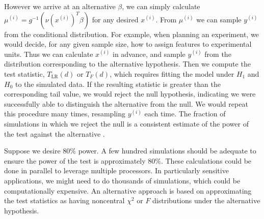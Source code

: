 \documentclass[12pt]{article}
\begin{document}
However we arrive at an alternative $\beta$, we can simply calculate $\mu^{(i)} = g^{-1}(\nu(x^{(i)})^T \beta)$ for any desired $x^{(i)}$. From $\mu^{(i)}$ we can sample $y^{(i)}$ from the conditional distribution. For example, when planning an experiment, we would decide, for any given sample size, how to assign features to experimental units. Thus we can calculate $x^{(i)}$ in advance, and sample $y^{(i)}$ from the distribution corresponding to the alternative hypothesis. Then we compute the test statistic, $T_{\textrm{LR}}(d)$ or $T_F(d)$, which requires fitting the model under $H_1$ and $H_0$ to the simulated data. If the resulting statistic is greater than the corresponding tail value, we would reject the null hypothesis, indicating we were successfully able to distinguish the alternative from the null. We would repeat this procedure many times, resampling $y^{(i)}$  each time. The fraction of simulations in which we reject the null is a consistent estimate of the power of the test against the alternative \cite{JBFM:15}. 

Suppose we desire $80\%$ power. A few hundred simulations should be adequate to ensure the power of the test is approximately $80\%$. These calculations could be done in parallel to leverage multiple processors. In particularly sensitive applications, we might need to do thousands of simulations, which could be computationally expensive. An alternative approach is based on approximating the test statistics as having noncentral $\chi^2$ or $F$ distributions under the alternative hypothesis. 
\end{document}
